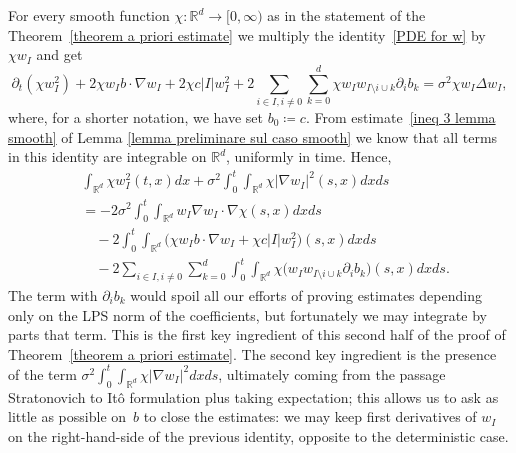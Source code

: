 \documentclass[a4paper,10pt]{article}
\newcommand\1{\mathbbm{1}}
\numberwithin{equation}{section}
\begin{document}
For every smooth function $\chi:\mathbb{R}^{d}\rightarrow \lbrack0,\infty)$ as in the statement of the Theorem~\ref{theorem a priori estimate} we multiply the identity~\eqref{PDE for w} by $\chi w_I$ and get
\[
\partial_{t}(\chi w_{I}^{2})  +2\chi w_{I}b\cdot\nabla
w_{I}+2\chi c\vert I\vert w_{I}^{2}+2\sum_{i\in I,i\neq0}\sum
_{k=0}^{d}\chi w_{I}w_{I\setminus i\cup k}\partial_{i}b_{k}=\sigma^{2}\chi
w_{I}\Delta w_{I},
\]
where, for a shorter notation, we have set $b_0 \coloneqq  c$. From estimate~\eqref{ineq 3 lemma smooth} of Lemma \ref{lemma preliminare sul caso smooth} we know that all terms in this identity are integrable on $\mathbb{R}^{d}$, uniformly in time. Hence, 
\begin{align*}
&  \int_{\mathbb{R}^{d}}\chi w_{I}^{2}(t,x)  dx+\sigma^{2} 
\int_{0}^{t}\int_{\mathbb{R}^{d}}\chi\vert \nabla w_{I}\vert
^{2} (s,x)dxds\\
&  =-2\sigma^{2}\int_{0}^{t}\int_{\mathbb{R}^{d}}w_{I}\nabla w_{I}\cdot\nabla\chi  (s,x) dxds\\
& \quad {}  -2\int_{0}^{t}\int_{\mathbb{R}^{d}} \big(\chi w_{I}b\cdot\nabla
w_{I}+\chi c\vert I\vert w_{I}^{2} \big)  (s,x)
dxds\\
& \quad {}  -2\sum_{i\in I,i\neq0}\sum_{k=0}^{d}\int_{0}^{t}\int_{\mathbb{R}^{d}} 
\chi \big(w_{I}w_{I\setminus i\cup k}\partial_{i}b_{k}\big)  (
s,x)  dxds .
\end{align*}
The term with $\partial_{i}b_{k}$ would spoil all our efforts of proving estimates depending only on the LPS norm of the coefficients, but fortunately we may integrate by parts that term. This is the first key ingredient of this second half of the proof of Theorem~\ref{theorem a priori estimate}. The second key ingredient is the presence of the term $\sigma^{2}\int_{0}^{t}\int_{\mathbb{R}^{d}}\chi\vert \nabla w_{I}\vert ^{2}dxds$, ultimately coming from the passage Stratonovich to It\^o formulation plus taking expectation; this allows us to ask as little as possible on~$b$ to close the estimates: we may keep first derivatives of $w_{I}$ on the right-hand-side of the previous identity, opposite to the deterministic case.
\end{document}
